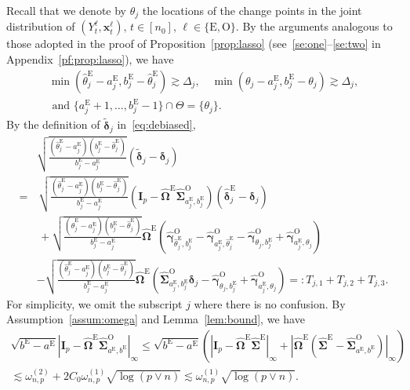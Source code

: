 \documentclass[11pt, a4paper]{article}
\newcommand{\mbf}{\mathbf}
\renewcommand{\l}{\left}
\renewcommand{\r}{\right}
\def\wh{\widehat}
\def\wc{\widetilde}
\newcommand{\cp}{\theta}
\newcommand{\Cp}{\Theta}
\newcommand{\nn}{\nonumber}
\newcommand{\tE}{\text{E}}
\newcommand{\tO}{\text{O}}
\theoremstyle{definition}
\theoremstyle{definition}
\theoremstyle{definition}
\theoremstyle{definition}
\theoremstyle{definition}
\theoremstyle{remark}
\theoremstyle{definition}
\theoremstyle{definition}
\theoremstyle{definition}
\begin{document}
Recall that we denote by $\cp_j$ the locations of the change points in the joint distribution of $(Y^{\ell}_t, \mbf x^{\ell}_t), \, t \in [n_0], \, \ell \in \{\tE, \tO\}$.
By the arguments analogous to those adopted in the proof of Proposition~\ref{prop:lasso} (see~\ref{se:one}--\ref{se:two} in Appendix~\ref{pf:prop:lasso}), we have 
\begin{multline}
\min(\wh\cp^{\tE}_j - a^{\tE}_j, b^{\tE}_j - \wh\cp^{\tE}_j) \gtrsim \Delta_j, \quad 
\min(\cp_j - a^{\tE}_j, b^{\tE}_j - \cp_j) \gtrsim \Delta_j, \\ 
\text{ and \ } \{a^{\tE}_j + 1, \ldots, b^{\tE}_j - 1 \} \cap \Cp = \{\cp_j\}.
\label{eq:ab:prop}
\end{multline}
By the definition of $\wc{\bm\delta}_j$ in~\eqref{eq:debiased},
\begin{align}
& \sqrt{\frac{ (\wh\cp^{\tE}_j - a^{\tE}_j) (b^{\tE}_j - \wh\cp^{\tE}_j) }{ b^{\tE}_j - a^{\tE}_j }}
\l( \wc{\bm\delta}_j - \bm\delta_j \r) 
\nn \\
=& \, \sqrt{\frac{ (\wh\cp^{\tE}_j - a^{\tE}_j) (b^{\tE}_j - \wh\cp^{\tE}_j) }{ b^{\tE}_j - a^{\tE}_j }} \l( \mbf I_p - \wh{\bm\Omega}^{\tE} \wh{\bm\Sigma}^{\tO}_{a^{\tE}_j, b^{\tE}_j} \r) \l( \wh{\bm\delta}^{\tE}_j - \bm\delta_j \r)
\nn \\
& \, + \sqrt{\frac{ (\wh\cp^{\tE}_j - a^{\tE}_j) (b^{\tE}_j - \wh\cp^{\tE}_j) }{ b^{\tE}_j - a^{\tE}_j }} \wh{\bm\Omega}^{\tE} \l( \wh{\bm\gamma}^{\tO}_{\wh\cp^{\tE}_j, b^{\tE}_j} - \wh{\bm\gamma}^{\tO}_{a^{\tE}_j, \wh\cp^{\tE}_j} - \wh{\bm\gamma}^{\tO}_{\cp_j, b^{\tE}_j} + \wh{\bm\gamma}^{\tO}_{a^{\tE}_j, \cp_j} \r)
\nn \\
&
- \sqrt{\frac{ (\wh\cp^{\tE}_j - a^{\tE}_j) (b^{\tE}_j - \wh\cp^{\tE}_j) }{ b^{\tE}_j - a^{\tE}_j }} \wh{\bm\Omega}^{\tE} \l( \wh{\bm\Sigma}^{\tO}_{a^{\tE}_j, b^{\tE}_j} \bm\delta_j - \wh{\bm\gamma}^{\tO}_{\cp_j, b^{\tE}_j} + \wh{\bm\gamma}^{\tO}_{a^{\tE}_j, \cp_j} \r)
=: T_{j, 1} + T_{j, 2} + T_{j, 3}.
\label{eq:debiased:decomp}
\end{align}
For simplicity, we omit the subscript $j$ where there is no confusion.
By Assumption~\ref{assum:omega} and Lemma~\ref{lem:bound}, we have 
\begin{multline*}
\sqrt{b^{\tE} - a^{\tE}} \l\vert \mbf I_p - \wh{\bm\Omega}^{\tE} \wh{\bm\Sigma}^{\tO}_{a^{\tE}, b^{\tE}} \r\vert_\infty \le 
\sqrt{b^{\tE} - a^{\tE}} \l( \l\vert \mbf I_p - \wh{\bm\Omega}^{\tE} \wh{\bm\Sigma}^{\tE} \r\vert_\infty + 
\l\vert \wh{\bm\Omega}^{\tE} \l( \wh{\bm\Sigma}^{\tE} - \wh{\bm\Sigma}^{\tO}_{a^{\tE}, b^{\tE}} \r) \r\vert_\infty \r)
\\
\lesssim \omega^{(2)}_{n, p} + 2 C_0 \omega^{(1)}_{n, p} \sqrt{\log(p \vee n)} \lesssim \omega^{(1)}_{n, p} \sqrt{\log(p \vee n)}.
\end{multline*}
\end{document}
